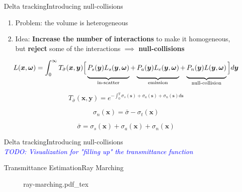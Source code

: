 \documentclass[
  english,            %
  aspectratio=169,    %
]{tumbeamer}
\newcommand\todo[1]{\textit{\textcolor{blue}{\\TODO: #1\\}}}
\newcommand\bx[0]{\bm{x}}
\newcommand\by[0]{\bm{y}}
\newcommand\bomega[0]{\bm{\omega}}
\newcommand*\mystrut[1]{\vrule width0pt height0pt depth#1\relax}
\begin{document}
\begin{frame}{Delta tracking}{Introducing null-collisions}
\begin{enumerate}
  \item Problem: the volume is heterogeneous
  \item Idea: \textbf{Increase the number of interactions} to make it
    homogeneous,\\
    but \textbf{reject} some of the interactions $\implies$
    \textbf{null-collisions}
\end{enumerate}

\begin{equation}
    L(\bx, \bomega) = \int_0^\infty 
    T_{\bar\sigma}(\bm{x},\bm{y})
    \Big[
        \underbrace{\mystrut{2ex}
            P_s(\by)L_s(\by, \bomega)
        }_{\text{in-scatter}}
        + 
        \underbrace{\mystrut{2ex}
            P_a(\by)L_e(\by, \bomega)
        }_{\text{emission}}
        +
        \underbrace{\mystrut{2ex}
            P_n(\by)L(\by, \bomega)
        }_{\text{null-collision}}
    \Big]
    d\by
\end{equation}

\vfill
\begin{equation}
  T_{\bar\sigma}(\bm{x},\bm{y}) = 
  e^{-\int_0^y \sigma_s(\bm{s}) + \sigma_a(\bm{s}) + \sigma_n(\bm{s}) d\bm{s}}
\end{equation}

\begin{equation}
  \sigma_n(\bx) = \bar\sigma - \sigma_t(\bx)
\end{equation}

\begin{equation}
  \bar\sigma = \sigma_s(\bm{x}) + \sigma_a(\bm{x}) + \sigma_n(\bm{x})
\end{equation}
\end{frame}

\begin{frame}{Delta tracking}{Introducing null-collisions}
  \todo{Visualization for "filling up" the transmittance function} 
\end{frame}

\begin{frame}{Transmittance Estimation}{Ray Marching}
\begin{figure}[ht]
    \centering
    \def\svgwidth{0.6\columnwidth}
    {ray-marching.pdf_tex}
\end{figure}
\end{frame}
\end{document}
